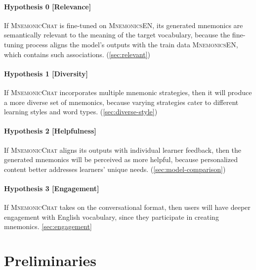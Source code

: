 \documentclass[11pt, onecolumn]{article}
\newcounter{para}
\begin{document}

\paragraph{Hypothesis 0 [Relevance]} If \textsc{MnemonicChat} is fine-tuned on \textsc{MnemonicsEN}, its generated mnemonics are semantically relevant to the meaning of the target vocabulary, because the fine-tuning process aligns the model's outputs with the train data \textsc{MnemonicsEN}, which contains such associations. (\ref{sec:relevant})

\paragraph{Hypothesis 1 [Diversity]} If \textsc{MnemonicChat} incorporates multiple mnemonic strategies, then it will produce a more diverse set of mnemonics, because varying strategies cater to different learning styles and word types. (\ref{sec:diverse-style})
\paragraph{Hypothesis 2 [Helpfulness]} If \textsc{MnemonicChat} aligns its outputs with individual learner feedback, then the generated mnemonics will be perceived as more helpful, because personalized content better addresses learners' unique needs. (\ref{sec:model-comparison})

\paragraph{Hypothesis 3 [Engagement]} If \textsc{MnemonicChat} takes on the conversational format, then users will have deeper engagement with English vocabulary, since they participate in creating mnemonics. \ref{sec:engagement}

\section{Preliminaries}
\end{document}
